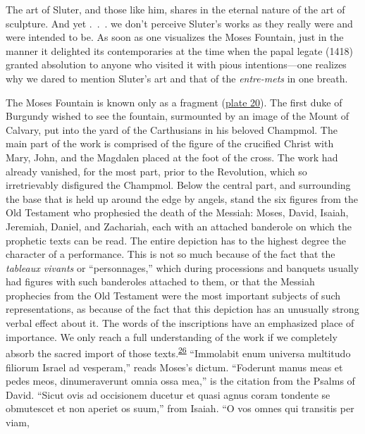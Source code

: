 The art of Sluter, and those like him, shares in the eternal nature of
the art of sculpture. And yet .~.~. we don't perceive Sluter's works as
they really were and were intended to be. As soon as one visualizes the
Moses Fountain, just in the manner it delighted its contemporaries at
the time when the papal legate (1418) granted absolution to anyone who
visited it with pious intentions---one realizes why we dared to mention
Sluter's art and that of the \emph{entre-mets} in one breath.

The Moses Fountain is known only as a fragment
(\protect\hyperlink{20_ILLUSTRATIONS_FOLLOW_PAGE.xhtmlux5cux23id_19}{plate
20}). The first duke of Burgundy wished to see the fountain, surmounted
by an image of the Mount of Calvary, put into the yard of the
Carthusians in his beloved Champmol. The main part of the work is
comprised of the figure of the crucified Christ with Mary, John, and the
Magdalen placed at the foot of the cross. The work had already vanished,
for the most part, prior to the Revolution, which so irretrievably
disfigured the Champmol. Below the central part,
\protect\hypertarget{20_ILLUSTRATIONS_FOLLOW_PAGE.xhtmlux5cux23page_309}{}{}and
surrounding the base that is held up around the edge by angels, stand
the six figures from the Old Testament who prophesied the death of the
Messiah: Moses, David, Isaiah, Jeremiah, Daniel, and Zachariah, each
with an attached banderole on which the prophetic texts can be read. The
entire depiction has to the highest degree the character of a
performance. This is not so much because of the fact that the
\emph{tableaux vivants} or ``personnages,'' which during processions and
banquets usually had figures with such banderoles attached to them, or
that the Messiah prophecies from the Old Testament were the most
important subjects of such representations, as because of the fact that
this depiction has an unusually strong verbal effect about it. The words
of the inscriptions have an emphasized place of importance. We only
reach a full understanding of the work if we completely absorb the
sacred import of those
texts.\textsuperscript{\protect\hypertarget{20_ILLUSTRATIONS_FOLLOW_PAGE.xhtmlux5cux23id_421}{\protect\hyperlink{23_NOTES.xhtmlux5cux23id_422}{26}}}
``Immolabit enum universa multitudo filiorum Israel ad vesperam,'' reads
Moses's dictum. ``Foderunt manus meas et pedes meos, dinumeraverunt
omnia ossa mea,'' is the citation from the Psalms of David. ``Sicut ovis
ad occisionem ducetur et quasi agnus coram tondente se obmutescet et non
aperiet os suum,'' from Isaiah. ``O vos omnes qui transitis per viam,
